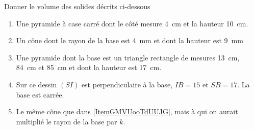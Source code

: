 
\begin{exercice}\label{exo2smath-0188}


    Donner le volume des solides décrits ci-dessous
    \begin{enumerate}
        \item
            Une pyramide à case carré dont le côté mesure \SI{4}{\centi\meter} et la hauteur \SI{10}{\centi\meter}.
        \item\label{ItemGMVUooTdUUJG}
            Un cône dont le rayon de la base est \SI{4}{\milli\meter} et dont la hauteur est \SI{9}{\milli\meter}
        \item
            Une pyramide dont la base est un triangle rectangle de mesures \SI{13}{\centi\meter}, \SI{84}{\centi\meter} et \SI{85}{\centi\meter} et dont la hauteur est \SI{17}{\centi\meter}.
        \item   \label{ItemGMVUooTdUUJGe}
            \begin{multicols}{2}
            Sur ce dessin \( (SI)\) est perpendiculaire à la base, \( IB=15\) et \( SB=17\). La base est carrée.
            \columnbreak
\begin{center}                                                                                     
                                                    
\end{center}


            \end{multicols}
        \item
            Le même cône que dans \ref{ItemGMVUooTdUUJG}, mais à qui on aurait multiplié le rayon de la base par \( k\).
    \end{enumerate}

\end{exercice}
